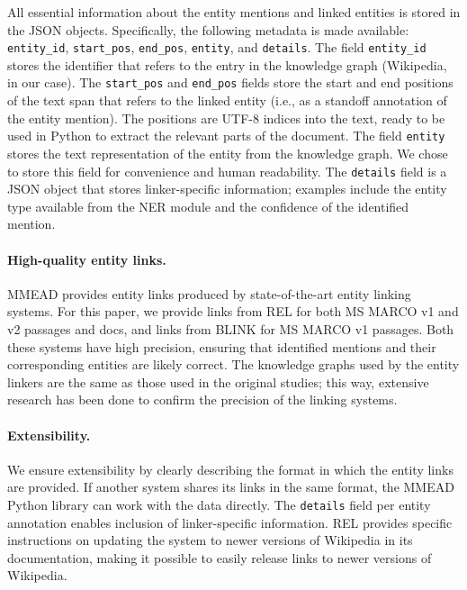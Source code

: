 All essential information about the entity mentions and linked entities is stored in the JSON objects. 
Specifically, the following metadata is made available: \texttt{entity\_id}, \texttt{start\_pos}, \texttt{end\_pos}, \texttt{entity}, and \texttt{details}. The field \texttt{entity\_id} stores the identifier that refers to the entry in the knowledge graph (Wikipedia, in our case). The \texttt{start\_pos} and \texttt{end\_pos} fields store the start and end positions of the text span that refers to the linked entity (i.e., as a standoff annotation of the entity mention). The positions are UTF-8 indices into the text, ready to be used in Python to extract the relevant parts of the document. The field \texttt{entity} stores the text representation of the entity from the knowledge graph. 
We chose to store this field for convenience and human readability. The \texttt{details} field is a JSON object that stores linker-specific information; examples include the entity type available from the NER module and the confidence of the identified mention.

\paragraph{High-quality entity links.} MMEAD provides entity links produced by state-of-the-art entity linking systems. For this paper, we provide links from REL for both MS MARCO v1 and v2 passages and docs, and links from BLINK for MS MARCO v1 passages. Both these systems have high precision, ensuring that identified mentions and their corresponding entities are likely correct. The knowledge graphs used by the entity linkers are the same as those used in the original studies; this way, extensive research has been done to confirm the precision of the linking systems.

\paragraph{Extensibility.} We ensure extensibility by clearly describing the format in which the entity links are provided. If another system shares its links in the same format, the MMEAD Python library can work with the data directly. The \texttt{details} field per entity annotation enables inclusion of linker-specific information. REL provides specific instructions on updating the system to newer versions of Wikipedia in its documentation, making it possible to easily release links to newer versions of Wikipedia.

